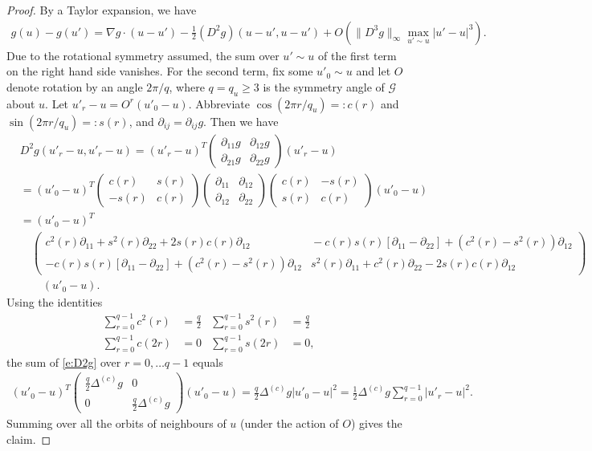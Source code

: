 \documentclass[11pt]{article}
\theoremstyle{remark}
\def\cG{\mathcal{G}}
\newcommand{\eqnspl}[2]{\begin{equation}\begin{split}\label{#1}%
   #2\end{split}\end{equation}}
\newcommand{\eqnsplst}[1]{\begin{equation*}\begin{split}%
   #1\end{split}\end{equation*}}
\begin{document}
\begin{proof}
By a Taylor expansion, we have
\eqnsplst{
  g(u) - g(u')
  = \nabla g \cdot (u - u') - \frac{1}{2} (D^2 g)(u-u',u-u') + O( \| D^3 g \|_\infty 
  \max_{u'\sim u} |u'-u|^3 ). }
Due to the rotational symmetry assumed, the sum over $u' \sim u$ of the first term on the right hand side 
vanishes. For the second term, fix some $u'_0 \sim u$ and let $O$ denote rotation by 
an angle $2\pi/q$, where $q = q_u \ge 3$ is the symmetry angle of $\cG$ about $u$. 
Let $u'_r - u = O^r (u'_0 - u)$.
Abbreviate $\cos(2\pi r/q_u) =: c(r)$ and $\sin(2\pi r/q_u) =: s(r)$, and 
$\partial_{ij} = \partial_{ij} g$. Then we have
\eqnspl{e:D2g}{
  &D^2 g (u'_r - u, u'_r - u)
  = (u'_r - u)^T \begin{pmatrix}
      \partial_{11} g & \partial_{12} g \\
      \partial_{21} g & \partial_{22} g
  \end{pmatrix} (u'_r - u) \\
  &= (u'_0 - u)^T \begin{pmatrix}
      c(r) & s(r) \\
      -s(r) & c(r)
  \end{pmatrix} \begin{pmatrix}
      \partial_{11} & \partial_{12} \\
      \partial_{12} & \partial_{22}
  \end{pmatrix} \begin{pmatrix}
      c(r) & -s(r) \\
      s(r) & c(r)
  \end{pmatrix} (u'_0 - u) \\
  &= (u'_0 - u)^T \\
  &\quad \begin{pmatrix}
      c^2(r) \partial_{11} + s^2(r) \partial_{22} + 2 s(r) c(r) \partial_{12} 
            & \!\!-c(r) s(r) [ \partial_{11} - \partial_{22} ] + (c^2(r) - s^2(r)) \partial_{12} \\
      -c(r) s(r) [ \partial_{11} - \partial_{22} ] + (c^2(r) - s^2(r)) \partial_{12}
            & \!\!s^2(r) \partial_{11} + c^2(r) \partial_{22} - 2 s(r) c(r) \partial_{12}
  \end{pmatrix} \\
     &\qquad (u'_0 - u). }
Using the identities 
\begin{align}
\label{e:averaging}
  \sum_{r=0}^{q-1} c^2(r)
  &= \frac{q}{2} & 
  \sum_{r=0}^{q-1} s^2(r)
  &=\frac{q}{2} \\
  \sum_{r=0}^{q-1} c(2r)
  &= 0 & 
  \sum_{r=0}^{q-1} s(2r)
  &= 0, 
\end{align}
the sum of \eqref{e:D2g} over $r = 0, \dots q-1$ equals
\eqnsplst{
  (u'_0 - u)^T \begin{pmatrix}
      \frac{q}{2} \Delta^{(c)} g & 0 \\
      0 & \frac{q}{2} \Delta^{(c)} g
  \end{pmatrix} (u'_0 - u)
  = \frac{q}{2} \Delta^{(c)} g |u'_0 - u|^2
  = \frac{1}{2} \Delta^{(c)} g \sum_{r=0}^{q-1} |u'_r - u|^2. }
Summing over all the orbits of neighbours of $u$ (under the action of $O$) gives the claim.
\end{proof}
\end{document}
